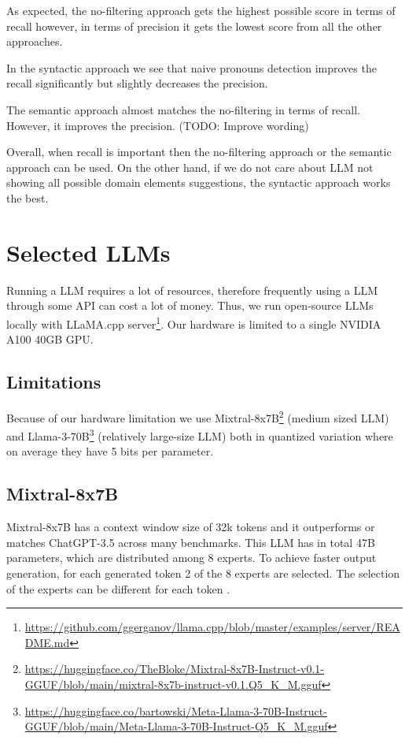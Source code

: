 As expected, the no-filtering approach gets the highest possible score in terms of recall however, in terms of precision it gets the lowest score from all the other approaches.

In the syntactic approach we see that naive pronouns detection improves the recall significantly but slightly decreases the precision.

The semantic approach almost matches the no-filtering in terms of recall. However, it improves the precision. (TODO: Improve wording)

Overall, when recall is important then the no-filtering approach or the semantic approach can be used. On the other hand, if we do not care about LLM not showing all possible domain elements suggestions, the syntactic approach works the best.


\section{Selected LLMs}

Running a LLM requires a lot of resources, therefore frequently using a LLM through some API can cost a lot of money. Thus, we run open-source LLMs locally with LLaMA.cpp server\footnote{\url{https://github.com/ggerganov/llama.cpp/blob/master/examples/server/README.md}}. Our hardware is limited to a single NVIDIA A100 40GB GPU.

\subsection{Limitations}
Because of our hardware limitation we use Mixtral-8x7B\footnote{\url{https://huggingface.co/TheBloke/Mixtral-8x7B-Instruct-v0.1-GGUF/blob/main/mixtral-8x7b-instruct-v0.1.Q5_K_M.gguf}} (medium sized LLM) \cite{Jiang2024} and Llama-3-70B\footnote{\url{https://huggingface.co/bartowski/Meta-Llama-3-70B-Instruct-GGUF/blob/main/Meta-Llama-3-70B-Instruct-Q5_K_M.gguf}} (relatively large-size LLM) both in quantized variation where on average they have 5 bits per parameter.


\subsection{Mixtral-8x7B}
Mixtral-8x7B has a context window size of 32k tokens and it outperforms or matches ChatGPT-3.5 across many benchmarks. This LLM has in total 47B parameters, which are distributed among 8 experts. To achieve faster output generation, for each generated token 2 of the 8 experts are selected. The selection of the experts can be different for each token \cite{Jiang2024}.


